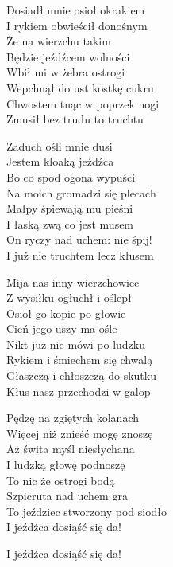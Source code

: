 \begin{text}
    Dosiadł mnie osioł okrakiem\\
    I rykiem obwieścił donośnym\\
    Że na wierzchu takim\\
    Będzie jeźdźcem wolności\\
    Wbił mi w żebra ostrogi\\
    Wepchnął do ust kostkę cukru\\
    Chwostem tnąc w poprzek nogi\\
    Zmusił bez trudu to truchtu

    Zaduch ośli mnie dusi\\
    Jestem kloaką jeźdźca\\
    Bo co spod ogona wypuści\\
    Na moich gromadzi się plecach\\
    Małpy śpiewają mu pieśni\\
    I łaską zwą co jest musem\\
    On ryczy nad uchem: nie śpij!\\
    I już nie truchtem lecz kłusem

    Mija nas inny wierzchowiec\\
    Z wysiłku ogłuchł i oślepł\\
    Osioł go kopie po głowie\\
    Cień jego uszy ma ośle\\
    Nikt już nie mówi po ludzku\\
    Rykiem i śmiechem się chwalą\\
    Głaszczą i chłoszczą do skutku\\
    Kłus nasz przechodzi w galop

    Pędzę na zgiętych kolanach\\
    Więcej niż znieść mogę znoszę\\
    Aż świta myśl niesłychana\\
    I ludzką głowę podnoszę\\
    To nic że ostrogi bodą\\
    Szpicruta nad uchem gra\\
    To jeździec stworzony pod siodło\\
    I jeźdźca dosiąść się da!

    I jeźdźca dosiąść się da!
\end{text}
